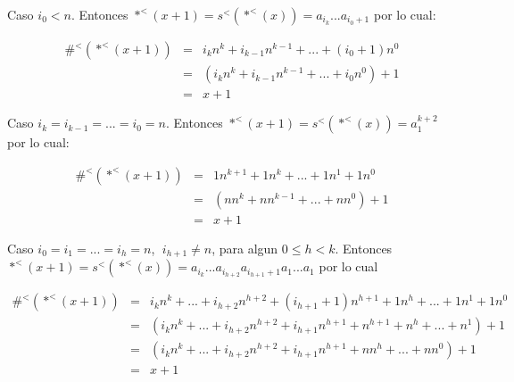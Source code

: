     Caso $i_{0}< n$. Entonces $\ast^{<}(x + 1)=s^{<}(\ast^{<}(x)) = a_{i_{k}} ... a_{i_{0} + 1}$ por lo cual:

    \begin{eqnarray}
      \nonumber \#^{<}(\ast^{<}(x+1)) &=& i_{k}n^{k}+i_{k-1}n^{k-1}+...+(i_{0}+1)n^{0} \\
      \nonumber &=& \left( i_{k}n^{k}+i_{k-1}n^{k-1}+...+i_{0}n^{0}\right) +1 \\
      \nonumber &=& x + 1
    \end{eqnarray}

    Caso $i_{k}=i_{k-1}=...=i_{0}=n$. Entonces $\ast^{<}(x + 1) = s^{<}(\ast^{<}(x)) = a_{1}^{k + 2}$ por lo cual:

    \begin{eqnarray}
      \nonumber \#^{<}(\ast^{<}(x+1)) &=& 1n^{k+1}+1n^{k}+...+1n^{1}+1n^{0} \\
      \nonumber &=& \left( nn^{k}+nn^{k-1}+...+nn^{0}\right) +1 \\
      \nonumber &=& x + 1
    \end{eqnarray}

    Caso $i_{0}=i_{1}=...=i_{h}=n$, $\;i_{h+1}\not=n$, para algun $ 0\leq h< k$. Entonces $\ast^{<}(x+1)=s^{<}(\ast^{<}(x))=a_{i_{k}}...a_{i_{h+2}}a_{i_{h+1}+1}a_{1}...a_{1}$ por lo cual

    \begin{eqnarray}
      \nonumber \#^{<}(\ast^{<}(x+1)) &=& i_{k}n^{k}+...+i_{h+2}n^{h+2}+(i_{h+1}+1)n^{h+1}+1n^{h}+...+1n^{1}+1n^{0} \\
      \nonumber &=& \left( i_{k}n^{k}+...+i_{h+2}n^{h+2}+i_{h+1}n^{h+1}+n^{h+1}+n^{h}+...+n^{1}\right) +1 \\
      \nonumber &=& \left( i_{k}n^{k}+...+i_{h+2}n^{h+2}+i_{h+1}n^{h+1}+nn^{h}+...+nn^{0}\right) +1 \\
      \nonumber &=& x + 1
    \end{eqnarray}

  \QED
